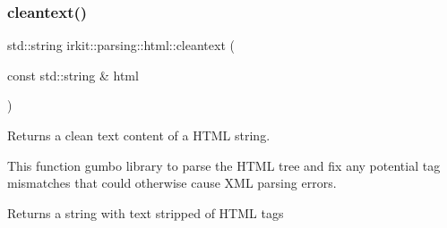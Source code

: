\subsubsection{\texorpdfstring{cleantext()}{cleantext()}\hspace{0.1cm}{\footnotesize\ttfamily [2/2]}}
{\footnotesize\ttfamily std\+::string irkit\+::parsing\+::html\+::cleantext (\begin{DoxyParamCaption}\item[{const std\+::string \&}]{html }\end{DoxyParamCaption})}



Returns a clean text content of a H\+T\+ML string. 

This function gumbo library to parse the H\+T\+ML tree and fix any potential tag mismatches that could otherwise cause X\+ML parsing errors. \begin{DoxyReturn}{Returns}
a string with text stripped of H\+T\+ML tags 
\end{DoxyReturn}

